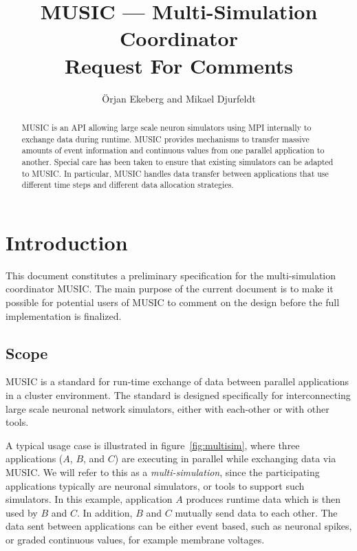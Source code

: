 \documentclass[a4paper]{report}
\begin{document}
\lstset{language=C++}

\title{MUSIC --- Multi-Simulation Coordinator\\[2ex]
  Request For Comments\\}

\author{Örjan Ekeberg and Mikael Djurfeldt}

\maketitle

\begin{abstract}
  MUSIC is an API allowing large scale neuron simulators using MPI
  internally to exchange data during runtime.  MUSIC provides
  mechanisms to transfer massive amounts of event information and
  continuous values from one parallel application to another.  Special
  care has been taken to ensure that existing simulators can be
  adapted to MUSIC.  In particular, MUSIC handles data transfer
  between applications that use different time steps and different
  data allocation strategies.
\end{abstract}


\tableofcontents

\listoffigures

\chapter{Introduction}

This document constitutes a preliminary specification for the
multi-simulation coordinator MUSIC.  The main purpose of the current
document is to make it possible for potential users of MUSIC to
comment on the design before the full implementation is finalized.

\section{Scope}

MUSIC is a standard for run-time exchange of data between parallel
applications in a cluster environment.  The standard is designed
specifically for interconnecting large scale neuronal network
simulators, either with each-other or with other tools.

A typical usage case is illustrated in figure~\ref{fig:multisim},
where three applications ($A$, $B$, and $C$) are executing in parallel
while exchanging data via MUSIC.  We will refer to this as a
\emph{multi-simulation}, since the participating applications
typically are neuronal simulators, or tools to support such
simulators.  In this example, application $A$ produces runtime data
which is then used by $B$ and $C$.  In addition, $B$ and $C$ mutually
send data to each other.  The data sent between applications can be
either event based, such as neuronal spikes, or graded continuous
values, for example membrane voltages.
\end{document}
